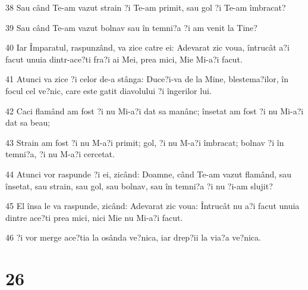 \par 38 Sau când Te-am vazut strain ?i Te-am primit, sau gol ?i Te-am îmbracat?
\par 39 Sau când Te-am vazut bolnav sau în temni?a ?i am venit la Tine?
\par 40 Iar Împaratul, raspunzând, va zice catre ei: Adevarat zic voua, întrucât a?i facut unuia dintr-ace?ti fra?i ai Mei, prea mici, Mie Mi-a?i facut.
\par 41 Atunci va zice ?i celor de-a stânga: Duce?i-va de la Mine, blestema?ilor, în focul cel ve?nic, care este gatit diavolului ?i îngerilor lui.
\par 42 Caci flamând am fost ?i nu Mi-a?i dat sa manânc; însetat am fost ?i nu Mi-a?i dat sa beau;
\par 43 Strain am fost ?i nu M-a?i primit; gol, ?i nu M-a?i îmbracat; bolnav ?i în temni?a, ?i nu M-a?i cercetat.
\par 44 Atunci vor raspunde ?i ei, zicând: Doamne, când Te-am vazut flamând, sau însetat, sau strain, sau gol, sau bolnav, sau în temni?a ?i nu ?i-am slujit?
\par 45 El însa le va raspunde, zicând: Adevarat zic voua: Întrucât nu a?i facut unuia dintre ace?ti prea mici, nici Mie nu Mi-a?i facut.
\par 46 ?i vor merge ace?tia la osânda ve?nica, iar drep?ii la via?a ve?nica.

\chapter{26}

